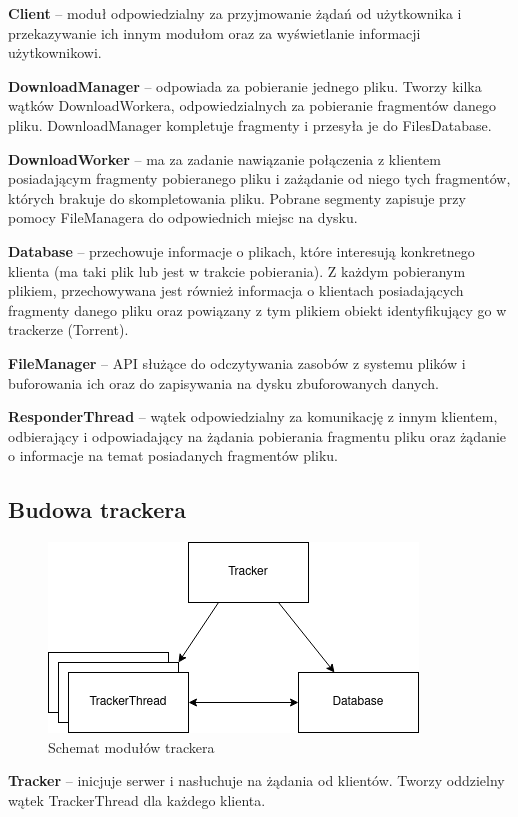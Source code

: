 \documentclass[11pt]{article}
\begin{document}
\textbf{Client} -- moduł odpowiedzialny za przyjmowanie żądań od użytkownika i przekazywanie ich innym modułom oraz za wyświetlanie informacji użytkownikowi.

\textbf{DownloadManager} -- odpowiada za pobieranie jednego pliku. Tworzy kilka wątków DownloadWorkera, odpowiedzialnych za pobieranie fragmentów danego pliku. DownloadManager kompletuje fragmenty i przesyła je do FilesDatabase.

\textbf{DownloadWorker} -- ma za zadanie nawiązanie połączenia z klientem posiadającym fragmenty pobieranego pliku i zażądanie od niego tych fragmentów, których brakuje do skompletowania pliku. Pobrane segmenty zapisuje przy pomocy FileManagera do odpowiednich miejsc na dysku.

\textbf{Database} -- przechowuje informacje o plikach, które interesują konkretnego klienta (ma taki plik lub jest w trakcie pobierania). Z każdym pobieranym plikiem, przechowywana jest również informacja o klientach posiadających fragmenty danego pliku oraz powiązany z tym plikiem obiekt identyfikujący go w trackerze (Torrent).

\textbf{FileManager} -- API służące do odczytywania zasobów z systemu plików i buforowania ich oraz do zapisywania na dysku zbuforowanych danych.

\textbf{ResponderThread} -- wątek odpowiedzialny za komunikację z innym klientem, odbierający i odpowiadający na żądania pobierania fragmentu pliku oraz żądanie o informacje na temat posiadanych fragmentów pliku. 

\clearpage
\subsection{Budowa trackera}
\begin{figure}[h]
\caption{Schemat modułów trackera}
\centering
\includegraphics[scale=0.7]{diagtracker}
\end{figure}
\textbf{Tracker} -- inicjuje serwer i nasłuchuje na żądania od klientów. Tworzy oddzielny wątek TrackerThread dla każdego klienta.
\end{document}
